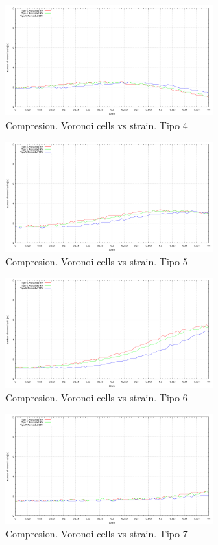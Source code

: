 \documentclass[10pt, oneside]{article} %
\begin{document}
\begin{figure}[H]
\centering
\includegraphics[width=8cm]{Figures/Porosidad_noVoronoi_strain_tipo4_comp.png}
\caption{Compresion. Voronoi cells vs strain. Tipo 4}
\end{figure}

\begin{figure}[H]
\centering
\includegraphics[width=8cm]{Figures/Porosidad_noVoronoi_strain_tipo5_comp.png}
\caption{Compresion. Voronoi cells vs strain. Tipo 5}
\end{figure}

\begin{figure}[H]
\centering
\includegraphics[width=8cm]{Figures/Porosidad_noVoronoi_strain_tipo6_comp.png}
\caption{Compresion. Voronoi cells vs strain. Tipo 6}
\end{figure}

\begin{figure}[H]
\centering
\includegraphics[width=8cm]{Figures/Porosidad_noVoronoi_strain_tipo7_comp.png}
\caption{Compresion. Voronoi cells vs strain. Tipo 7}
\end{figure}
\end{document}
